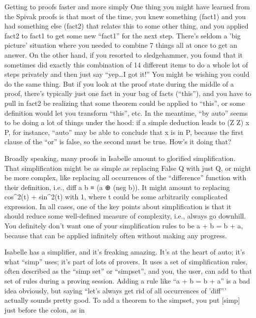 Getting to proofs faster and more simply
One thing you might have learned from the Spivak proofs is that most of the time, you knew something (fact1) and you had something else (fact2) that relates this to some other thing, and you applied fact2 to fact1 to get some new ``fact1'' for the next step. There's seldom a 'big picture' situation where you needed to combine 7 things all at once to get an answer. On the other hand, if you resorted to sledgehammer, you found that it sometimes did exactly this combination of 14 different items to do a whole lot of steps privately and then just say ``yep\ldots I got it!'' You might be wishing you could do the same thing. But if you look at the proof state during the middle of a proof, there's typically just one fact in your bag of facts (``this''), and you have to pull in fact2 be realizing that some theorem could be applied to ``this'', or some definition would let you transform ``this'', etc. In the meantime, ``by auto'' seems to be doing a lot of things under the hood: if a simple deduction leads to (Z \notequal Z) \/ x \in P, for instance, ``auto'' may be able to conclude that x is in P, because the first clause of the ``or'' is false, so the second must be true. How's it doing that? 

Broadly speaking, many proofs in Isabelle amount to glorified simplification. That simplification might be as simple as replacing False \/ Q with just Q, or might be more complex, like replacing all occurrences of the ``difference'' function with their definition, i.e., diff a b ≡ (a ⊕ (neg b)). It might amount to replacing cos^2(t) + sin^2(t) with 1, where t could be some arbitrarily complicated expression. In all cases, one of the key points about simplification is that it should reduce some well-defined measure of complexity, i.e., always go downhill. You definitely don't want one of your simplification rules to be a + b = b + a, because that can be applied infinitely often without making any progress. 

Isabelle has a simplifier, and it's freaking amazing. It's at the heart of auto; it's what ``simp'' uses; it's part of lots of provers. It uses a set of simplification rules, often described as the ``simp set'' or ``simpset'', and you, the user, can add to that set of rules during a proving session. Adding a rule like ``a + b = b + a'' is a bad idea obviously, but saying ``let's always get rid of all occurrences of 'diff''' actually sounds pretty good. To add a theorem to the simpset, you put [simp] just before the colon, as in 


